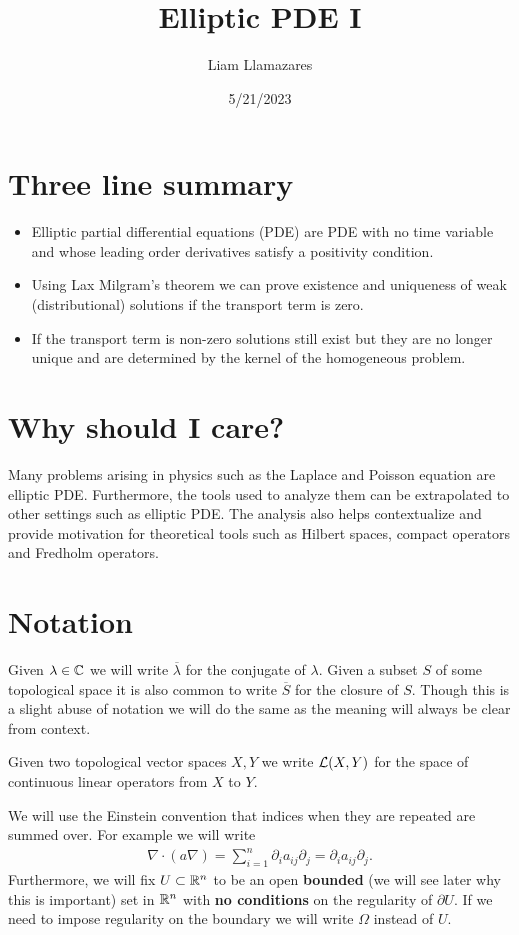 \documentclass[12pt]{article}
\theoremstyle{definition}
\begin{document}
\title{Elliptic PDE I}
\author{Liam Llamazares}
\date{5/21/2023}
\maketitle
\section{ Three line summary}
\begin{itemize}
	\item Elliptic partial differential equations (PDE) are PDE with no time variable and whose leading order derivatives satisfy a positivity condition.
	\item Using Lax Milgram's theorem we can prove existence and uniqueness of weak (distributional) solutions if the transport term is zero.
	\item If the transport term is non-zero solutions still exist but they are no longer unique and are determined by the kernel of the homogeneous problem.\end{itemize}
\section{Why should I care?}
Many problems arising in physics such as the Laplace and Poisson equation are elliptic PDE. Furthermore, the tools used to analyze them can be extrapolated to other settings such as
elliptic PDE. The analysis also helps contextualize and provide motivation for theoretical tools such as Hilbert spaces, compact operators and Fredholm operators.
\section{Notation}
Given $\lambda \in \mathbb{C}$ we will write $\overline{\lambda }$ for the conjugate of $\lambda $. Given a subset $S$ of some topological space it is also common to write  $\overline{S}$ for the closure of $S$. Though this is a slight abuse of notation we will do the same as the meaning will always be clear from context.

Given two topological vector spaces $X,Y$ we write  $\mathcal{L}(X,Y)$ for the space of continuous linear operators from $X$ to  $Y$.

We will use the Einstein convention that indices when they are repeated are summed over. For example we will write
\begin{align*}
	\nabla \cdot (a \nabla)=\sum_{i=1}^n \partial_i a_{ij} \partial _j =\partial_i a_{ij} \partial _j.
\end{align*}
Furthermore, we will fix $U \subset \mathbb{R}^n$ to be an open \textbf{bounded} (we will see later why this is important) set in $\mathbb{R}^n$ with \textbf{no conditions} on the regularity of $\partial U$. If we need to impose regularity on the boundary we will write $\Omega$ instead of $U$.
\end{document}

